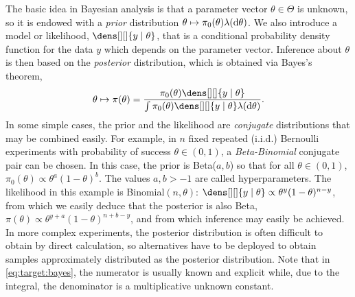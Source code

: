 \documentclass[english,graybox,envcountchap,envcountsame,sectrefs,shortlabels]{svmono}
\theoremstyle{style}
\begin{document}
\begin{example}
The basic idea in Bayesian analysis is that a parameter vector $ \theta \in \Theta$ is unknown, so it is endowed with a \emph{prior} distribution
$\theta\mapsto \pi_0( \theta)\lambda(\mathrm{d} \theta)$.  We also
introduce a model or likelihood, $\dens[][]{ y \mid \theta}$, that is
a conditional probability density function for the data $y$ which depends on the parameter vector.
Inference about $ \theta$ is then based on the \emph{posterior}
distribution, which is obtained via Bayes's theorem,
\begin{equation} \label{eq:target:bayes}
\theta \mapsto \pi(\theta) =\frac{\pi_0( \theta) \dens[][]{ y \mid \theta}}{\int \pi_0( \theta) \dens[][]{ y \mid \theta} \lambda(\rmd \theta)}.
\end{equation}
  In some simple cases, the prior  and
the likelihood are \emph{conjugate}  distributions that may be combined easily.
For example, in $n$ fixed repeated (i.i.d.) Bernoulli experiments with probability of success $\theta\in(0,1)$,
a \emph{Beta-Binomial} conjugate pair can be chosen.  In this case, the prior is
Beta($a,b$) so that for all $\theta\in (0,1)$,  $\pi_0(\theta) \propto \theta^{a} (1-\theta)^{b}$. The values $a,b > -1$  are called
hyperparameters. The likelihood in this example is
Binomial$(n,\theta)$:
$\dens[][]{ y \mid \theta} \propto \theta^y (1-\theta)^{n-y}$, from which
we easily deduce that the
posterior is also Beta,
$\pi ( \theta ) \propto \theta^{y+a}(1-\theta)^{n+b-y }
$, and from which inference may easily be achieved. In more complex experiments, the posterior distribution is often difficult to obtain by direct calculation,
so alternatives have to be deployed to obtain samples approximately distributed as the posterior distribution. Note that in \eqref{eq:target:bayes}, the numerator is usually known and explicit while, due to the integral, the denominator is a multiplicative unknown constant.  
\end{example}
\end{document}
